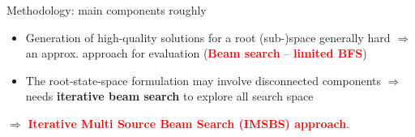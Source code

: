 \documentclass{beamer}
\begin{document}

\begin{frame}{Methodology: main components roughly}%
	
	\begin{itemize}
		\item  Generation of high-quality  solutions for a root (sub-)space generally hard $\Rightarrow$  an approx. approach for evaluation (\textcolor{red}{\textbf{Beam search} -- \textbf{limited BFS}}) \vspace{0.5cm}
		\item  The root-state-space formulation may involve disconnected components  $\Rightarrow$ needs \textbf{iterative beam search} to explore all search space 
	\end{itemize} \vspace{0.7cm}
	
	$\Longrightarrow$ \textcolor{red}{\textbf{ Iterative Multi Source Beam Search (IMSBS) approach}}. 
\end{frame}
	
\end{document}
